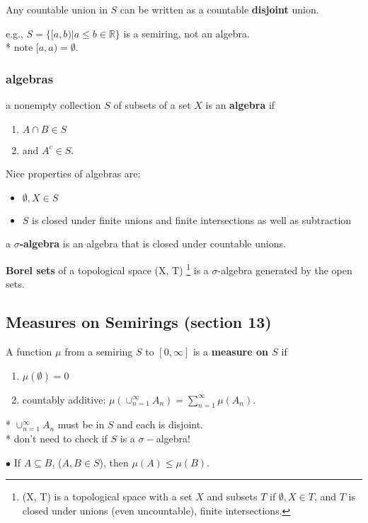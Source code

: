 \documentclass[a4paper, 12pt]{article}
\def\R{\ensuremath{\mathbb{R}}} %
\newcommand{\bt}[1]{\textbf{#1}} %
\newcommand{\tab}{\phantom{ssss}}
\begin{document}
\begin{multicols}{2}
Any countable union in $S$ can be written as a countable \bt{disjoint} union.

e.g., $S = \{[a, b) | a \leq b \in \R\}$ is a semiring, not an algebra. \\
* note $[a, a) = \emptyset$.


\subsubsection{algebras}

a nonempty collection $S$ of subsets of a set $X$ is an \bt{algebra} if 
\begin{enumerate}
    \item $A \cap B \in S$ 
    \item and $A^c \in S$. 
\end{enumerate}

Nice properties of algebras are: 
\begin{itemize}
    \item $\emptyset, X \in S$ 
    \item $S$ is closed under finite unions 
and finite intersections as well as subtraction
\end{itemize}

a \bt{$\sigma$-algebra} is an algebra that is closed under countable unions.

\bt{Borel sets} of a topological space (X, T) 
\footnote{(X, T) is a topological space with a set $X$ and subsets $T$ if
$\emptyset, X \in T$, and $T$ is closed under unions (even uncountable), finite intersections.}
is a $\sigma$-algebra 
generated by the open sets.

\subsection{Measures on Semirings (section 13)}
A function $\mu$ from a semiring $S$ to $[0, \infty]$ is a \bt{measure on $S$} if 
\begin{enumerate}
    \item $\mu(\emptyset) = 0$ 
    \item countably additive: $\mu(\cup_{n=1}^\infty A_n) = \sum_{n=1}^\infty \mu(A_n)$.
\end{enumerate}
* $\cup_{n=1}^\infty A_n$ must be in $S$ and each is disjoint. \\
\tab * don't need to check if $S$ is a $\sigma-$algebra!

\noindent $\bullet$ If $A \subseteq B$, ($A, B \in S$), then $\mu(A) \leq \mu(B)$.




\end{multicols}
\end{document}
